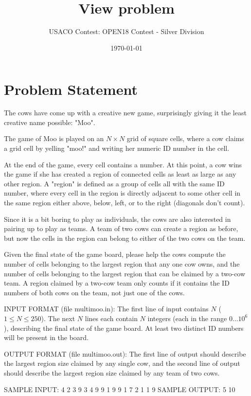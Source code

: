 \documentclass[12pt]{article}
\title{View problem}
\author{USACO Contest: OPEN18 Contest - Silver Division}
\date{\today}
\begin{document}
\maketitle

\section*{Problem Statement}

The cows have come up with a creative new game, surprisingly giving it the least
creative name possible: "Moo".

The game of Moo is played on an $N \times N$ grid of square cells, where a cow
claims a  grid cell by yelling "moo!" and writing her numeric ID number in the
cell.  

At the end of the game, every cell contains a number.  At this point, a cow wins
the game if she has created a region of connected cells as least as large as any
other region.  A "region" is defined as a group of cells all with the same ID
number, where every cell in the region is directly adjacent to some other cell
in the same region either above, below, left, or to the right (diagonals don't
count).  

Since it is a bit boring to play as individuals, the cows are also interested in
pairing up to play as teams.  A team of two cows can create a region as before,
but now the cells in the region can belong to either of the two cows on the
team.

Given the final state of the game board, please help the cows compute the number
of cells  belonging to the largest region that any one cow owns, and the number
of cells belonging  to the largest region that can be claimed by a two-cow team.
A region claimed by a two-cow team only counts if it contains the ID numbers of
both cows on the team, not just one of the cows.

INPUT FORMAT (file multimoo.in):
The first line of input contains $N$ ($1 \leq N \leq 250$).  The next $N$ lines
each contain $N$ integers (each in the range $0 \ldots 10^6$), describing the
final state of the game board.  At least two distinct ID numbers will be present
in the board.

OUTPUT FORMAT (file multimoo.out):
The first line of output should describe the largest region size claimed by any
single cow, and the second line of output should describe the largest region
size claimed by any team of two cows.  

SAMPLE INPUT:
4
2 3 9 3
4 9 9 1
9 9 1 7
2 1 1 9
SAMPLE OUTPUT: 
5
10
\end{document}

